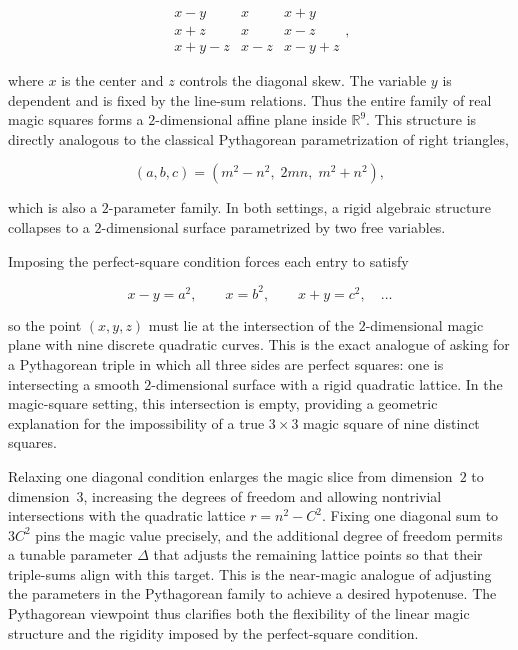 \documentclass[12pt]{article}
\begin{document}
\[
\begin{matrix}
x-y & x   & x+y \\
x+z & x   & x-z \\
x+y-z & x-z & x-y+z
\end{matrix},
\]


where $x$ is the center and $z$ controls the diagonal skew.  The variable $y$
is dependent and is fixed by the line-sum relations.  Thus the entire family
of real magic squares forms a $2$-dimensional affine plane inside
$\mathbb{R}^9$.  This structure is directly analogous to the classical
Pythagorean parametrization of right triangles,


\[
(a,b,c)=(m^2-n^2,\;2mn,\;m^2+n^2),
\]


which is also a $2$-parameter family.  In both settings, a rigid algebraic
structure collapses to a $2$-dimensional surface parametrized by two free
variables.

Imposing the perfect-square condition forces each entry to satisfy


\[
x-y=a^2,\qquad x=b^2,\qquad x+y=c^2,\quad \dots
\]


so the point $(x,y,z)$ must lie at the intersection of the $2$-dimensional
magic plane with nine discrete quadratic curves.  This is the exact analogue
of asking for a Pythagorean triple in which all three sides are perfect
squares: one is intersecting a smooth $2$-dimensional surface with a rigid
quadratic lattice.  In the magic-square setting, this intersection is empty,
providing a geometric explanation for the impossibility of a true $3\times 3$
magic square of nine distinct squares.

Relaxing one diagonal condition enlarges the magic slice from dimension~$2$ to
dimension~$3$, increasing the degrees of freedom and allowing nontrivial
intersections with the quadratic lattice $r=n^2-C^2$.  Fixing one diagonal sum
to $3C^2$ pins the magic value precisely, and the additional degree of freedom
permits a tunable parameter $\Delta$ that adjusts the remaining lattice points
so that their triple-sums align with this target.  This is the near-magic
analogue of adjusting the parameters in the Pythagorean family to achieve a
desired hypotenuse.  The Pythagorean viewpoint thus clarifies both the
flexibility of the linear magic structure and the rigidity imposed by the
perfect-square condition.
\end{document}
